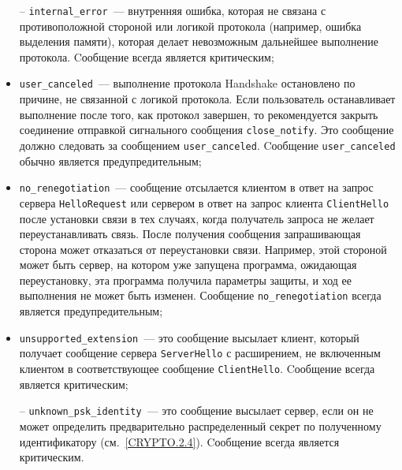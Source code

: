 \begin{itemize}
\item[--] 
\lstinline{internal_error}~--- внутренняя ошибка, которая не 
связана  с противоположной стороной или логикой протокола (например, ошибка 
выделения памяти), которая делает невозможным дальнейшее выполнение 
протокола. Cообщение всегда является критическим; 

\item[--]
\lstinline{user_canceled}~--- выполнение протокола Handshake 
остановлено по причине, не связанной с логикой протокола. Если 
пользователь останавливает выполнение после того, как протокол завершен, 
то рекомендуется закрыть соединение отправкой сигнального сообщения 
\lstinline{close_notify}. Это сообщение должно следовать за сообщением 
\lstinline{user_canceled}. Cообщение \lstinline{user_canceled} обычно 
является предупредительным;  

\item[--]
\lstinline{no_renegotiation}~--- сообщение отсылается клиентом в 
ответ на запрос сервера \lstinline{HelloRequest} или сервером в ответ на запрос 
клиента \lstinline{ClientHello} после установки связи в тех случаях, когда получатель 
запроса не желает переустанавливать связь. После получения сообщения 
запрашивающая сторона может отказаться от переустановки связи. Например, 
этой стороной может быть  сервер, на котором уже запущена программа, 
ожидающая переустановку, эта программа получила параметры защиты, и ход ее 
выполнения не может быть изменен. Сообщение \lstinline{no_renegotiation} всегда 
является предупредительным; 

\item[--] 
\lstinline{unsupported_extension}~--- это сообщение высылает клиент, 
который получает сообщение сервера \lstinline{ServerHello} с расширением, не 
включенным клиентом в соответствующее сообщение \lstinline{ClientHello}. 
Cообщение всегда является критическим; 

\item[--] 
\lstinline{unknown_psk_identity}~--- это сообщение высылает сервер, 
если он не может определить предварительно распределенный секрет по 
полученному идентификатору (см.~\ref{CRYPTO.2.4}). Cообщение всегда 
является критическим. 
\end{itemize}


                                 